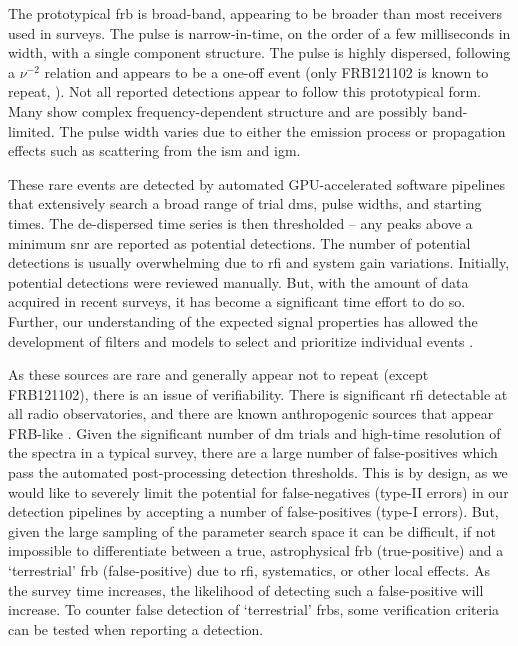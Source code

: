 \documentclass[a4paper,fleqn,usenatbib]{mnras}
\begin{document}
The prototypical \gls{frb} is broad-band, appearing to be broader than most
receivers used in surveys. The pulse is narrow-in-time, on the order of a few
milliseconds in width, with a single component structure. The pulse is highly
dispersed, following a $\nu^{-2}$ relation and appears to be a one-off event
(only FRB121102 is known to repeat, \citealt{2016Natur.531..202S}). Not all
reported detections appear to follow this prototypical form. Many show complex
frequency-dependent structure and are possibly band-limited. The pulse width
varies due to either the emission process or propagation effects such as
scattering from the \gls{ism} and \gls{igm}.

These rare events are detected by automated GPU-accelerated software pipelines
that extensively search a broad range of trial \glspl{dm}, pulse widths, and
starting times.  The de-dispersed time series is then thresholded -- any
peaks above a minimum \gls{snr} are reported as potential detections. The number
of potential detections is usually overwhelming due to \gls{rfi} and system gain
variations. Initially, potential detections were reviewed manually. But, with
the amount of data acquired in recent surveys, it has become a significant time
effort to do so. Further, our understanding of the expected signal properties
has allowed the development of filters and models to select and prioritize
individual events \citep[e.g.][]{2018MNRAS.474.3847F}.

As these sources are rare and generally appear not to repeat (except FRB121102),
there is an issue of verifiability. There is significant \gls{rfi} detectable at
all radio observatories, and there are known anthropogenic sources that appear
FRB-like \citep{2011ApJ...727...18B}.  Given the significant number of \gls{dm}
trials and high-time resolution of the spectra in a typical survey, there are a
large number of false-positives which pass the automated post-processing
detection thresholds.  This is by design, as we would like to severely limit the
potential for false-negatives (type-II errors) in our detection pipelines by
accepting a number of false-positives (type-I errors).  But, given the large
sampling of the parameter search space it can be difficult, if not impossible to
differentiate between a true, astrophysical \gls{frb} (true-positive) and a
`terrestrial' \gls{frb} (false-positive) due to \gls{rfi}, systematics, or other
local effects. As the survey time increases, the likelihood of detecting such a
false-positive will increase. To counter false detection of `terrestrial'
\glspl{frb}, some verification criteria can be tested when reporting a detection.
\end{document}
